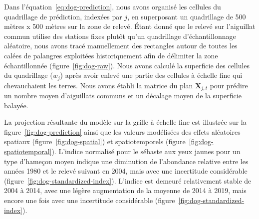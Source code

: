 \documentclass[11pt]{book}
\begin{document}
Dans l'équation~\ref{eq:dog-prediction}, nous avons organisé les cellules du quadrillage de prédiction, indexées par \(j\), en superposant un quadrillage de 500 mètres x 500 mètres sur la zone de relevé. Étant donné que le relevé sur l'aiguillat commun utilise des stations fixes plutôt qu'un quadrillage d'échantillonnage aléatoire, nous avons tracé manuellement des rectangles autour de toutes les calées de palangres exploitées historiquement afin de délimiter la zone échantillonnée (figure~\ref{fig:dog-raw}). Nous avons calculé la superficie des cellules du quadrillage (\(w_j\)) après avoir enlevé une partie des cellules à échelle fine qui chevauchaient les terres. Nous avons établi la matrice du plan \(\bm{X}_{j,t}\) pour prédire un nombre moyen d'aiguillats communs et un décalage moyen de la superficie balayée.

La projection résultante du modèle sur la grille à échelle fine est illustrée sur la figure~\ref{fig:dog-prediction} ainsi que les valeurs modélisées des effets aléatoires spatiaux (figure~\ref{fig:dog-spatial}) et spatiotemporels (figure~\ref{fig:dog-spatiotemporal}). L'indice normalisé pour le sébaste aux yeux jaunes pour un type d'hameçon moyen indique une diminution de l'abondance relative entre les années 1980 et le relevé suivant en 2004, mais avec une incertitude considérable (figure~\ref{fig:dog-standardized-index}). L'indice est demeuré relativement stable de 2004 à 2014, avec une légère augmentation de la moyenne de 2014 à 2019, mais encore une fois avec une incertitude considérable (figure~\ref{fig:dog-standardized-index}).
\end{document}

